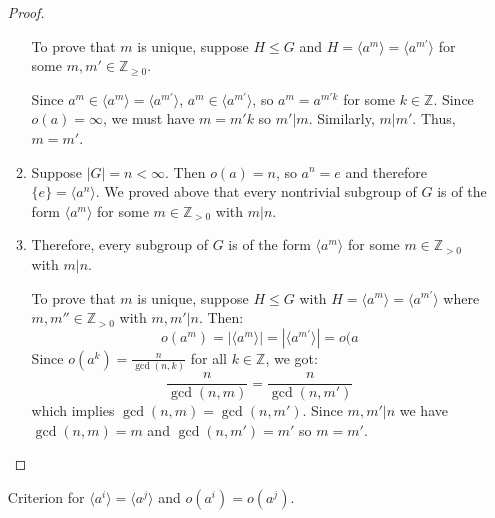\begin{itemize}
\begin{proof}
\begin{enumerate}
            To prove that $m$ is unique, suppose $H \le G$ and $H = \langle a^m\rangle = \langle a^{m'}\rangle$ for some $m,m' \in \mathbb{Z}_{\ge 0}$.

            Since $a^m \in \langle a^m \rangle = \langle a^{m'} \rangle$, $a^{m} \in \langle a^{m'} \rangle$, so $a^m=a^{m'k}$ for some $k \in \mathbb{Z}$. Since $o(a)=\infty$, we must have $m=m'k$ so $m'|m$. Similarly, $m|m'$. Thus, $m=m'$.
            \item Suppose $|G| = n < \infty$. Then $o(a) = n$, so $a^n=e$ and therefore $\{e\} = \langle a^n \rangle$. We proved above that every nontrivial subgroup of $G$ is of the form $\langle a^m \rangle$ for some $m\in \mathbb{Z}_{>0}$ with $m|n$.
            \item 
            Therefore, every subgroup of $G$ is of the form $\langle a^m\rangle $ for some $m \in \mathbb{Z}_{>0}$ with $m|n$.
            
            To prove that $m$ is unique, suppose $H \le G$ with $H = \langle a^m \rangle = \langle a^{m'}\rangle$ where $m,m'' \in \mathbb{Z}_{>0}$ with $m,m' | n$. Then:
            \begin{equation}
                o(a^m) = |\langle a^m \rangle | = |\langle a^{m'} \rangle | = o(a%
            \end{equation}
            Since $o(a^k) = \frac{n}{\gcd(n,k)}$ for all $k\in \mathbb{Z}$, we got:
            \begin{equation}
                \frac{n}{\gcd(n,m)} = \frac{n}{\gcd(n,m')}
            \end{equation}
            which implies $\gcd(n,m) = \gcd(n,m')$. Since $m,m'|n$ we have $\gcd(n,m)=m$ and $\gcd(n,m')=m'$ so $m=m'$.
        \end{enumerate}
    \end{proof}
    \begin{corollary}
        Criterion for $\langle a^i \rangle = \langle a^j \rangle$ and $o(a^i) = o(a^j)$.
        \vspace{2mm}


\end{corollary}
\end{itemize}

